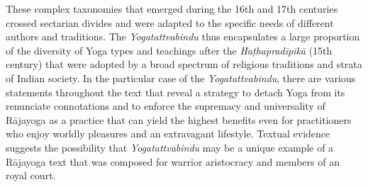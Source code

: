 These complex taxonomies that emerged during the 16th and 17th centuries crossed sectarian divides and were adapted to the specific needs of different authors and traditions. The \textit{Yogatattvabindu} thus encapsulates a large proportion of the diversity of Yoga types and teachings after the \textit{Haṭhapradīpikā} (15th century) that were adopted by a broad spectrum of religious traditions and strata of Indian society. In the particular case of the \textit{Yogatattvabindu}, there are various statements throughout the text that reveal a strategy to detach Yoga from its renunciate connotations and to enforce the supremacy and universality of Rājayoga as a practice that can yield the highest benefits even for practitioners who enjoy worldly pleasures and an extravagant lifestyle. Textual evidence suggests the possibility that \textit{Yogatattvabindu} may be a unique example of a Rājayoga text that was composed for warrior aristocracy and members of an royal court. 


